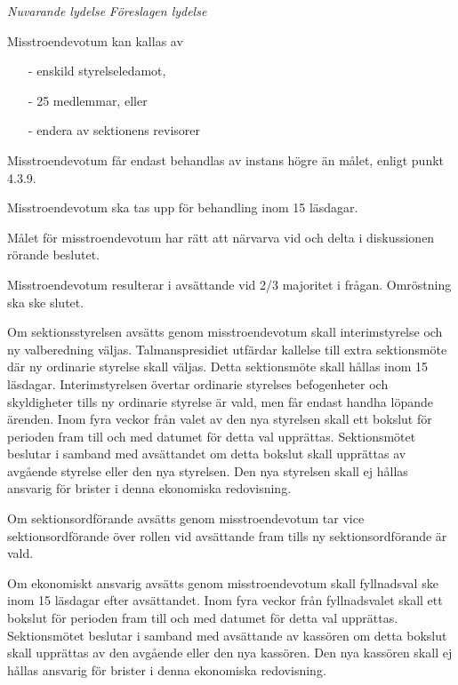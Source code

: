 \documentclass{article}
\newenvironment{lydelse}
    {\begin{paracol}{2}%
        \emph{Nuvarande lydelse}%
        \switchcolumn%
        \emph{Föreslagen lydelse}%
    \end{paracol}%
    \begin{enumerate}[label=\thesubsection.\arabic*]%
    \begin{paracol}{2}%
    }{\end{paracol}\end{enumerate}}
\begin{document}
\begin{lydelse}
    \setcounter{subsection}{3}
    \item Misstroendevotum kan kallas av
	  \begin{itemize}
		\item[-] enskild styrelseledamot, 
  		\item[-] 25 medlemmar, eller
  		\item[-] endera av sektionens revisorer
  	  \end{itemize}
	
	\item Misstroendevotum får endast behandlas av instans högre än målet, enligt punkt 4.3.9.

  	\item Misstroendevotum ska tas upp för behandling inom 15 läsdagar.

  	\item Målet för misstroendevotum har rätt att närvarva vid och delta i diskussionen rörande beslutet.

  	\item Misstroendevotum resulterar i avsättande vid 2/3 majoritet i frågan. Omröstning ska ske slutet. 

  	\item Om sektionsstyrelsen avsätts genom misstroendevotum skall interimstyrelse och ny valberedning väljas. Talmanspresidiet utfärdar kallelse till extra sektionsmöte där ny ordinarie styrelse skall väljas. Detta sektionsmöte skall hållas inom 15 läsdagar. Interimstyrelsen övertar ordinarie styrelses befogenheter och skyldigheter tills ny ordinarie styrelse är vald, men får endast handha löpande ärenden. Inom fyra veckor från valet av den nya styrelsen skall ett bokslut för perioden fram till och med datumet för detta val upprättas. Sektionsmötet beslutar i samband med avsättandet om detta bokslut skall upprättas av avgående styrelse eller den nya styrelsen. Den nya styrelsen skall ej hållas ansvarig för brister i denna ekonomiska redovisning.

  	\item Om sektionsordförande avsätts genom misstroendevotum tar vice sektionsordförande över rollen vid avsättande fram tills ny sektionsordförande är vald.

  	\item Om ekonomiskt ansvarig avsätts genom misstroendevotum skall fyllnadsval ske inom 15 läsdagar efter avsättandet. Inom fyra veckor från fyllnadsvalet skall ett bokslut för perioden fram till och med datumet för detta val upprättas. Sektionsmötet beslutar i samband med avsättande av kassören om detta bokslut skall upprättas av den avgående eller den nya kassören. Den nya kassören skall ej hållas  ansvarig för brister i denna ekonomiska redovisning. 


\end{lydelse}
\end{document}
